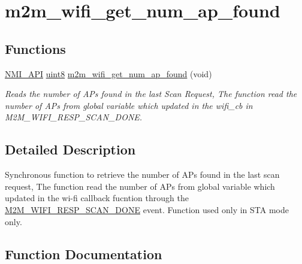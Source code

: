 \hypertarget{group__WifiGetNumAPFoundFn}{}\section{m2m\+\_\+wifi\+\_\+get\+\_\+num\+\_\+ap\+\_\+found}
\label{group__WifiGetNumAPFoundFn}
\subsection*{Functions}
\begin{DoxyCompactItemize}
\item 
\hyperlink{group__BSPDefine_gaecc0323d771e41ef81a76b5f12783e22}{N\+M\+I\+\_\+\+A\+PI} \hyperlink{group__DataT_ga4df709a77647e870bbf1d955b8edc9a6}{uint8} \hyperlink{group__WifiGetNumAPFoundFn_gac92223273822358f4aee6e133b11815d}{m2m\+\_\+wifi\+\_\+get\+\_\+num\+\_\+ap\+\_\+found} (void)
\begin{DoxyCompactList}\small\item\em Reads the number of AP\textquotesingle{}s found in the last Scan Request, The function read the number of AP\textquotesingle{}s from global variable which updated in the wifi\+\_\+cb in M2\+M\+\_\+\+W\+I\+F\+I\+\_\+\+R\+E\+S\+P\+\_\+\+S\+C\+A\+N\+\_\+\+D\+O\+NE. \end{DoxyCompactList}\end{DoxyCompactItemize}


\subsection{Detailed Description}
Synchronous function to retrieve the number of AP\textquotesingle{}s found in the last scan request, The function read the number of AP\textquotesingle{}s from global variable which updated in the wi-\/fi callback fucntion through the \hyperlink{group__WlanEnums_gga064de09dec1d5e88ed8d075fa40f57dead835febbe18b7e3cc6ce4693951354fe}{M2\+M\+\_\+\+W\+I\+F\+I\+\_\+\+R\+E\+S\+P\+\_\+\+S\+C\+A\+N\+\_\+\+D\+O\+NE} event. Function used only in S\+TA mode only. 

\subsection{Function Documentation}
\mbox{\label{group__WifiGetNumAPFoundFn_gac92223273822358f4aee6e133b11815d}} 
